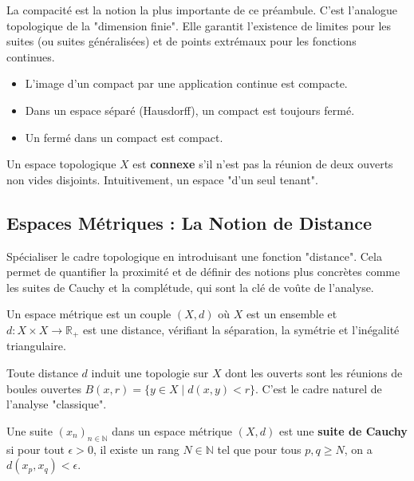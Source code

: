 \begin{remark}
    La compacité est la notion la plus importante de ce préambule. C'est l'analogue topologique de la "dimension finie". Elle garantit l'existence de limites pour les suites (ou suites généralisées) et de points extrémaux pour les fonctions continues.
    \begin{itemize}
        \item L'image d'un compact par une application continue est compacte.
        \item Dans un espace séparé (Hausdorff), un compact est toujours fermé.
        \item Un fermé dans un compact est compact.
    \end{itemize}
\end{remark}

\begin{definition}[Connexité]
    Un espace topologique $X$ est \textbf{connexe} s'il n'est pas la réunion de deux ouverts non vides disjoints. Intuitivement, un espace "d'un seul tenant".
\end{definition}

\subsection{Espaces Métriques : La Notion de Distance}

\begin{objectif}
    Spécialiser le cadre topologique en introduisant une fonction "distance". Cela permet de quantifier la proximité et de définir des notions plus concrètes comme les suites de Cauchy et la complétude, qui sont la clé de voûte de l'analyse.
\end{objectif}

\begin{definition}
    Un espace métrique est un couple $(X, d)$ où $X$ est un ensemble et $d: X \times X \to \mathbb{R}_+$ est une distance, vérifiant la séparation, la symétrie et l'inégalité triangulaire.
\end{definition}

\begin{remark}
    Toute distance $d$ induit une topologie sur $X$ dont les ouverts sont les réunions de boules ouvertes $B(x, r) = \{y \in X \mid d(x,y) < r\}$. C'est le cadre naturel de l'analyse "classique".
\end{remark}

\begin{definition}
    Une suite $(x_n)_{n \in \mathbb{N}}$ dans un espace métrique $(X,d)$ est une \textbf{suite de Cauchy} si pour tout $\epsilon > 0$, il existe un rang $N \in \mathbb{N}$ tel que pour tous $p, q \geq N$, on a $d(x_p, x_q) < \epsilon$.
\end{definition}

